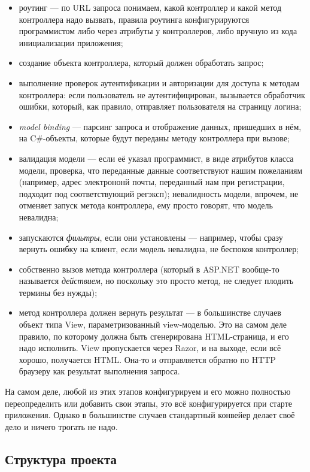 \documentclass{../../text-style}
\begin{document}
\begin{itemize}
    \item роутинг --- по URL запроса понимаем, какой контроллер и какой метод контроллера надо вызвать, правила роутинга конфигурируются программистом либо через атрибуты у контроллеров, либо вручную из кода инициализации приложения;
    \item создание объекта контроллера, который должен обработать запрос;
    \item выполнение проверок аутентификации и авторизации для доступа к методам контроллера: если пользователь не аутентифицирован, вызывается обработчик ошибки, который, как правило, отправляет пользователя на страницу логина;
    \item \emph{model binding} --- парсинг запроса и отображение данных, пришедших в нём, на C\#-объекты, которые будут переданы методу контроллера при вызове;
    \item валидация модели --- если её указал программист, в виде атрибутов класса модели, проверка, что переданные данные соответствуют нашим пожеланиям (например, адрес электрононй почты, переданный нам при регистрации, подходит под соответствующий регэксп); невалидность модели, впрочем, не отменяет запуск метода контроллера, ему просто говорят, что модель невалидна;
    \item запускаются \emph{фильтры}, если они установлены --- например, чтобы сразу вернуть ошибку на клиент, если модель невалидна, не беспокоя контроллер;
    \item собственно вызов метода контроллера (который в ASP.NET вообще-то называется \emph{действием}, но поскольку это просто метод, не следует плодить термины без нужды);
    \item метод контроллера должен вернуть результат --- в большинстве случаев объект типа View, параметризованный view-моделью. Это на самом деле правило, по которому должна быть сгенерирована HTML-страница, и его надо исполнить. View пропускается через Razor, и на выходе, если всё хорошо, получается HTML. Она-то и отправляется обратно по HTTP браузеру как результат выполнения запроса.
\end{itemize}

На самом деле, любой из этих этапов конфигурируем и его можно полностью переопределить или добавить свои этапы, это всё конфигурируется при старте приложения. Однако в большинстве случаев стандартный конвейер делает своё дело и ничего трогать не надо.

\subsection{Структура проекта}
\end{document}

